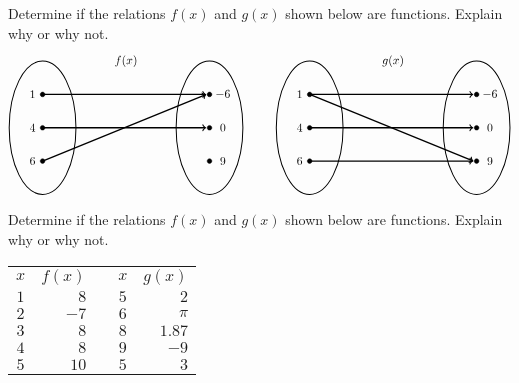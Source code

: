 \documentclass[11pt,letterpaper]{article}
\begin{document}
\prob Determine if the relations $f(x)$ and $g(x)$ shown below are functions. Explain why or why not. 
	\[
	\begin{tikzpicture}
	\node at (2.5,2) {$f(x)$};
	\draw[line width=0.03cm] (0,0) circle (1 and 2);
	\draw[line width=0.03cm] (5,0) circle (1 and 2);
	
	\draw[fill=black] (0,1) circle (0.07);
	\draw[fill=black] (0,0) circle (0.07);
	\draw[fill=black] (0,-1) circle (0.07);
	
	\draw[fill=black] (5,1) circle (0.07);
	\draw[fill=black] (5,0) circle (0.07);
	\draw[fill=black] (5,-1) circle (0.07);
	
	\draw[line width=0.04cm,->] (0,1) -- (4.9,1);
	\draw[line width=0.04cm,->] (0,0) -- (4.9,0);
	\draw[line width=0.04cm,->] (0,-1) -- (4.9,1);
	
	\node at (-0.3,1) {$1$};
	\node at (-0.3,0) {$4$};
	\node at (-0.3,-1) {$6$};
	
	\node at (5.4,1) {$-6$};
	\node at (5.4,0) {$0$};
	\node at (5.4,-1) {$9$};
	
	\tikzset{shift={(8,0)}}
	\node at (2.5,2) {$g(x)$};
	\draw[line width=0.03cm] (0,0) circle (1 and 2);
	\draw[line width=0.03cm] (5,0) circle (1 and 2);
	
	\draw[fill=black] (0,1) circle (0.07);
	\draw[fill=black] (0,0) circle (0.07);
	\draw[fill=black] (0,-1) circle (0.07);
	
	\draw[fill=black] (5,1) circle (0.07);
	\draw[fill=black] (5,0) circle (0.07);
	\draw[fill=black] (5,-1) circle (0.07);
	
	\draw[line width=0.04cm,->] (0,1) -- (4.9,1);
	\draw[line width=0.04cm,->] (0,1) -- (4.9,-1);
	\draw[line width=0.04cm,->] (0,0) -- (4.9,0);
	\draw[line width=0.04cm,->] (0,-1) -- (4.9,-1);
	
	\node at (-0.3,1) {$1$};
	\node at (-0.3,0) {$4$};
	\node at (-0.3,-1) {$6$};
	
	\node at (5.4,1) {$-6$};
	\node at (5.4,0) {$0$};
	\node at (5.4,-1) {$9$};
	\end{tikzpicture}
	\] \pspace


\prob  Determine if the relations $f(x)$ and $g(x)$ shown below are functions. Explain why or why not. 
	\begin{table}[H]
	\centering
	\begin{tabular}{c|rcc|r}
	$x$ & $f(x)$ & \hspace{1cm} & $x$ & $g(x)$ \\ \cline{1-2} \cline{4-5}
	$1$ & $8$ & & $5$ & $2$ \\
	$2$ & $-7$ & & $6$ & $\pi$ \\
	$3$ & $8$ & & $8$ & $1.87$ \\
	$4$ & $8$ & & $9$ & $-9$ \\
	$5$ & $10$ & & $5$ & $3$
	\end{tabular}
	\end{table} \pspace
\end{document}
